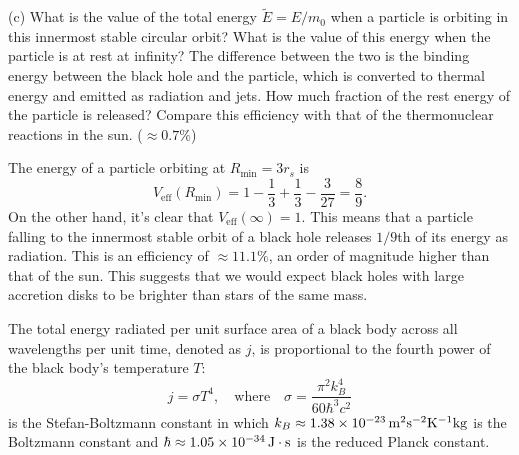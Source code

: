 \documentclass{../../templates/lkx_pset}
\begin{document}
\begin{parts}
	\begin{part}{(c)}
		What is the value of the total energy $\widetilde{E} = E/m_0$ when a particle is orbiting in this innermost stable circular orbit? What is the value of this energy when the particle is at rest at infinity?
		The difference between the two is the binding energy between the black hole and the particle, which is converted to thermal energy and emitted as radiation and jets. How much fraction of the rest energy of the particle is released? Compare this efficiency with that of the thermonuclear reactions in the sun. ($\approx 0.7\%$)
	\end{part}

	The energy of a particle orbiting at $R_{\textrm{min}}=3r_s$ is 
	\[V_{\textrm{eff}}(R_{\textrm{min}}) = 1 - \frac{1}{3} + \frac{1}{3} - \frac{3}{27} = \frac{8}{9}.\]
	On the other hand, it's clear that $V_{\textrm{eff}}(\infty)=1$. This means that a particle falling to the innermost stable orbit of a black hole releases $1/9$th of its energy as radiation. This is an efficiency of $\approx 11.1\%$, an order of magnitude higher than that of the sun. This suggests that we would expect black holes with large accretion disks to be brighter than stars of the same mass.
\end{parts}

\begin{problem}{3}
The total energy radiated per unit surface area of a black body across all wavelengths per unit time, denoted as $j$, is proportional to the fourth power of the black body's temperature $T$:
\[
	j = \sigma T^4,\quad\textrm{where}\quad\sigma = \frac{\pi^2k_B^4}{60\hbar^3 c^2}
\]
is the Stefan-Boltzmann constant in which $k_B \approx \kBsi{1.38e-23}$ is the Boltzmann constant and $\hbar\approx \hsi{1.05e-34}$ is the reduced Planck constant.
\end{problem}
\end{document}
